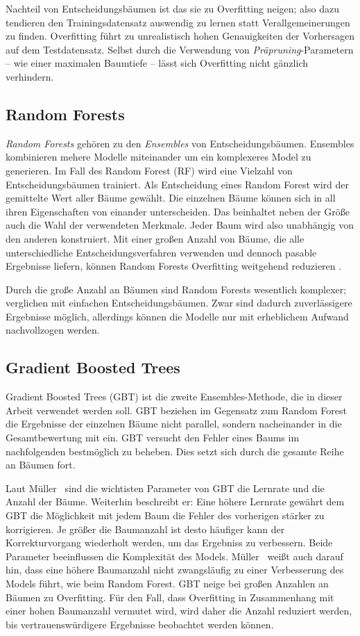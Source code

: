 Nachteil von Entscheidungsbäumen ist das sie zu Overfitting neigen; also dazu tendieren den Trainingsdatensatz auswendig zu lernen statt Verallgemeinerungen zu finden. Overfitting führt zu unrealistisch hohen Genauigkeiten der Vorhersagen auf dem Testdatensatz. Selbst durch die Verwendung von \textit{Präpruning}-Parametern -- wie einer maximalen Baumtiefe -- lässt sich Overfitting nicht gänzlich verhindern. \cite{Muller.2017}

\subsection{Random Forests}
\label{subsec:random_forest}
\textit{Random Forests} gehören zu den \textit{Ensembles} von Entscheidungsbäumen. Ensembles kombinieren mehere Modelle miteinander um ein komplexeres Model zu generieren. Im Fall des Random Forest (RF) wird eine Vielzahl von Entscheidungsbäumen trainiert. Als Entscheidung eines Random Forest wird der gemittelte Wert aller Bäume gewählt. Die einzelnen Bäume können sich in all ihren Eigenschaften von einander unterscheiden. Das beinhaltet neben der Größe auch die Wahl der verwendeten Merkmale. Jeder Baum wird also unabhängig von den anderen konstruiert. Mit einer großen Anzahl von Bäume, die alle unterschiedliche Entscheidungsverfahren verwenden und dennoch pasable Ergebnisse liefern, können Random Forests Overfitting weitgehend reduzieren \cite{Muller.2017}. 

Durch die große Anzahl an Bäumen sind Random Forests wesentlich komplexer; verglichen mit einfachen Entscheidungsbäumen. Zwar sind dadurch zuverlässigere Ergebnisse möglich, allerdings können die Modelle nur mit erheblichem Aufwand nachvollzogen werden.

\subsection{Gradient Boosted Trees}
\label{subsec:gradient_boosted_trees}
Gradient Boosted Trees (GBT) ist die zweite Ensembles-Methode, die in dieser Arbeit verwendet werden soll. GBT beziehen im Gegensatz zum Random Forest die Ergebnisse der einzelnen Bäume nicht parallel, sondern nacheinander in die Gesamtbewertung mit ein. GBT versucht den Fehler eines Baums im nachfolgenden bestmöglich zu beheben. Dies setzt sich durch die gesamte Reihe an Bäumen fort.

Laut Müller~\cite{Muller.2017} sind die wichtisten Parameter von GBT die Lernrate und die Anzahl der Bäume. Weiterhin beschreibt er: Eine höhere Lernrate gewährt dem GBT die Möglichkeit mit jedem Baum die Fehler des vorherigen stärker zu korrigieren. Je größer die Baumanzahl ist desto häufiger kann der Korrekturvorgang wiederholt werden, um das Ergebniss zu verbessern. Beide Parameter beeinflussen die Komplexität des Models. Müller~\cite{Muller.2017} weißt auch darauf hin, dass eine höhere Baumanzahl nicht zwangsläufig zu einer Verbesserung des Models führt, wie beim Random Forest. GBT neige bei großen Anzahlen an Bäumen zu Overfitting. Für den Fall, dass Overfitting in Zusammenhang mit einer hohen Baumanzahl vermutet wird, wird daher die Anzahl reduziert werden, bis vertrauenswürdigere Ergebnisse beobachtet werden können.


